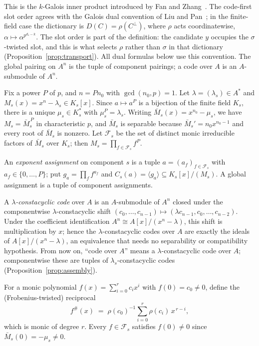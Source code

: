 \documentclass[10pt,journal,draftclsnofoot,onecolumn]{IEEEtran}
\theoremstyle{definition}
\theoremstyle{remark}
\begin{document}
This is the \(k\)-Galois inner product introduced by Fan and
Zhang~\cite{FZ2017}. The code-first slot order agrees with the Galois
dual convention of Liu and Pan~\cite{LP2020}; in the finite-field case
the dictionary is \(D(C) = \rho(C^\perp)\), where \(\rho\) acts
coordinatewise, \(\alpha \mapsto \alpha^{p^{d_s-k}}\). The slot order is part of the definition: the candidate \(y\) occupies
the \(\sigma\)-twisted slot, and this is what selects \(\rho\) rather
than \(\sigma\) in that dictionary
(Proposition~\ref{prop:transport}). All dual formulas below use this convention. The global
pairing on \(A^n\) is the tuple of component pairings; a code over \(A\)
is an \(A\)-submodule of \(A^n\).

Fix a power \(P\) of \(p\), and \(n = P n_0\) with
\(\gcd(n_0, p) = 1\). Let \(\lambda = (\lambda_s) \in A^*\) and
\(M_s(x) = x^n - \lambda_s \in K_s[x]\). Since \(a \mapsto a^P\) is a
bijection of the finite field \(K_s\), there is a unique \(\mu_s \in K_s^*\)
with \(\mu_s^P = \lambda_s\). Writing \(\bar M_s(x) = x^{n_0} - \mu_s\), we
have \(M_s = \bar M_s^{\,P}\) in characteristic \(p\), and \(\bar M_s\) is
separable because \(\bar M_s' = n_0 x^{n_0-1}\) and every root of
\(\bar M_s\) is nonzero. Let \(\mathcal{F}_s\) be the set of distinct
monic irreducible factors of \(\bar M_s\) over \(K_s\); then
\(M_s = \prod_{f \in \mathcal{F}_s} f^P\).

An \emph{exponent assignment} on component \(s\) is a tuple
\(a = (a_f)_{f \in \mathcal{F}_s}\) with \(a_f \in \{0, \dots, P\}\); put
\(g_a = \prod_f f^{a_f}\) and \(C_s(a) = \langle g_a \rangle \subseteq
K_s[x]/(M_s)\). A global assignment is a tuple of component assignments.

A \emph{\(\lambda\)-constacyclic code} over \(A\) is an \(A\)-submodule of
\(A^n\) closed under the componentwise \(\lambda\)-constacyclic shift
\((c_0,\dots,c_{n-1}) \mapsto (\lambda c_{n-1}, c_0, \dots, c_{n-2})\).
Under the coefficient identification \(A^n \cong A[x]/(x^n-\lambda)\), this
shift is multiplication by \(x\); hence the \(\lambda\)-constacyclic codes
over \(A\) are exactly the ideals of \(A[x]/(x^n-\lambda)\), an equivalence
that needs no separability or compatibility hypothesis. From now on,
``code over \(A\)'' means a \(\lambda\)-constacyclic code over \(A\);
componentwise these are tuples of \(\lambda_s\)-constacyclic codes
(Proposition~\ref{prop:assembly}).

For a monic polynomial \(f(x) = \sum_{i=0}^{r} c_i x^i\) with
\(f(0) = c_0 \ne 0\), define the (Frobenius-twisted) reciprocal
\[
f^{\#}(x) \;=\; \rho(c_0)^{-1} \sum_{i=0}^{r} \rho(c_i)\, x^{\,r-i},
\]
which is monic of degree \(r\). Every \(f \in \mathcal{F}_s\) satisfies
\(f(0) \ne 0\) since \(\bar M_s(0) = -\mu_s \ne 0\).
\end{document}
